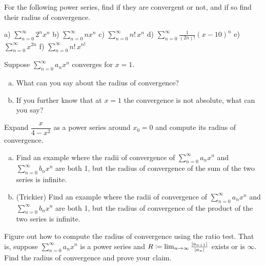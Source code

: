\begin{exercise}
For the following power series, find if they are convergent or not, and
if so find their radius of convergence.

\medskip

\noindent
a)
$\displaystyle \sum_{n=0}^\infty 2^n x^n$
\qquad
b) $\displaystyle \sum_{n=0}^\infty n x^n$
\qquad 
c) 
$\displaystyle \sum_{n=0}^\infty n! \, x^n$
\qquad
d) $\displaystyle \sum_{n=0}^\infty \frac{1}{(2n)!} {(x-10)}^n$
\qquad
e) $\displaystyle \sum_{n=0}^\infty x^{2n}$
\qquad
f) $\displaystyle \sum_{n=0}^\infty n! \, x^{n!}$
\end{exercise}

\begin{exercise}
Suppose $\sum_{n=0}^\infty a_n x^n$ converges for $x=1$.
\begin{enumerate}[a)]
\item
What can you say about the radius of convergence?
\item
If you further know that at $x=1$ the convergence is not absolute,
what can you say?
\end{enumerate}
\end{exercise}

\begin{exercise}
Expand
$\dfrac{x}{4-x^2}$ as a power series around $x_0 = 0$ and compute its radius
of convergence.
\end{exercise}

\begin{exercise}
\leavevmode
\begin{enumerate}[a)]
\item
Find an example where the radii of convergence of $\sum_{n=0}^\infty a_n x^n$ and
$\sum_{n=0}^\infty b_n x^n$ are both 1, but the radius of convergence of
the sum of the two series is infinite.
\item
(Trickier)
Find an example where the radii of convergence of $\sum_{n=0}^\infty a_n x^n$ and
$\sum_{n=0}^\infty b_n x^n$ are both 1, but the radius of convergence of
the product of the two series is infinite.
\end{enumerate}
\end{exercise}

\begin{exercise}
Figure out how to compute the radius of convergence using the ratio test.
That is, suppose $\sum_{n=0}^\infty a_n x^n$ is a power series and
$R \coloneqq \lim_{n\to\infty} \frac{\left\lvert {a_{n+1}} \right\rvert}{\left\lvert {a_n} \right\rvert}$ exists or is $\infty$.
Find the radius of convergence and prove your claim.
\end{exercise}

